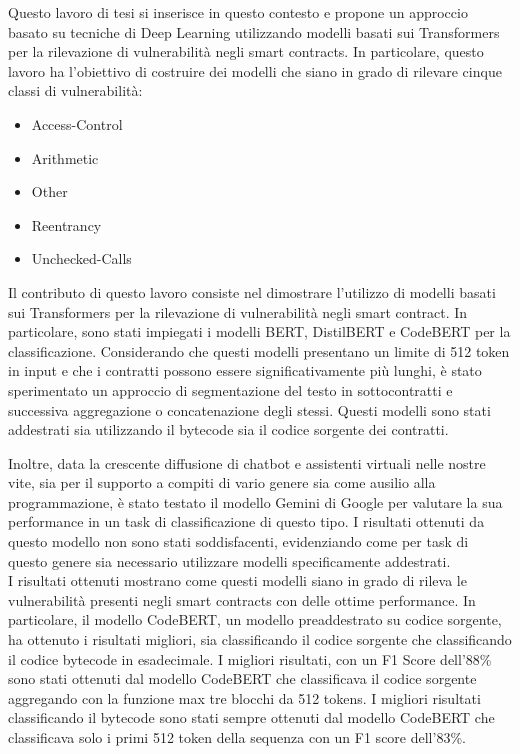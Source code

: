 \documentclass[../../Thesis.tex]{subfiles}
\begin{document}
Questo lavoro di tesi si inserisce in questo contesto e propone un approccio basato su tecniche di Deep Learning utilizzando modelli basati sui Transformers per la rilevazione di vulnerabilità negli smart contracts. In particolare, questo lavoro ha l'obiettivo di costruire dei modelli che siano in grado di rilevare cinque classi di vulnerabilità:
\begin{itemize}
    \item Access-Control
    \item Arithmetic
    \item Other
    \item Reentrancy
    \item Unchecked-Calls
\end{itemize}
 
Il contributo di questo lavoro consiste nel dimostrare l'utilizzo di modelli basati sui Transformers per la rilevazione di vulnerabilità negli smart contract. In particolare, sono stati impiegati i modelli BERT, DistilBERT e CodeBERT per la classificazione. Considerando che questi modelli presentano un limite di 512 token in input e che i contratti possono essere significativamente più lunghi, è stato sperimentato un approccio di segmentazione del testo in sottocontratti e successiva aggregazione o concatenazione degli stessi. Questi modelli sono stati addestrati sia utilizzando il bytecode sia il codice sorgente dei contratti.

Inoltre, data la crescente diffusione di chatbot e assistenti virtuali nelle nostre vite, sia per il supporto a compiti di vario genere sia come ausilio alla programmazione, è stato testato il modello Gemini di Google per valutare la sua performance in un task di classificazione di questo tipo. I risultati ottenuti da questo modello non sono stati soddisfacenti, evidenziando come per task di questo genere sia necessario utilizzare modelli specificamente addestrati.\\

I risultati ottenuti mostrano come questi modelli siano in grado di rileva le vulnerabilità presenti negli smart contracts con delle ottime performance. In particolare, il modello CodeBERT, un modello preaddestrato su codice sorgente, ha ottenuto i risultati migliori, sia classificando il codice sorgente che classificando il codice bytecode in esadecimale. I migliori risultati, con un F1 Score dell'88\% sono stati ottenuti dal modello CodeBERT che classificava il codice sorgente aggregando con la funzione max tre blocchi da 512 tokens. I migliori risultati classificando il bytecode sono stati sempre ottenuti dal modello CodeBERT che classificava solo i primi 512 token della sequenza con un F1 score dell'83\%.\\
\end{document}
